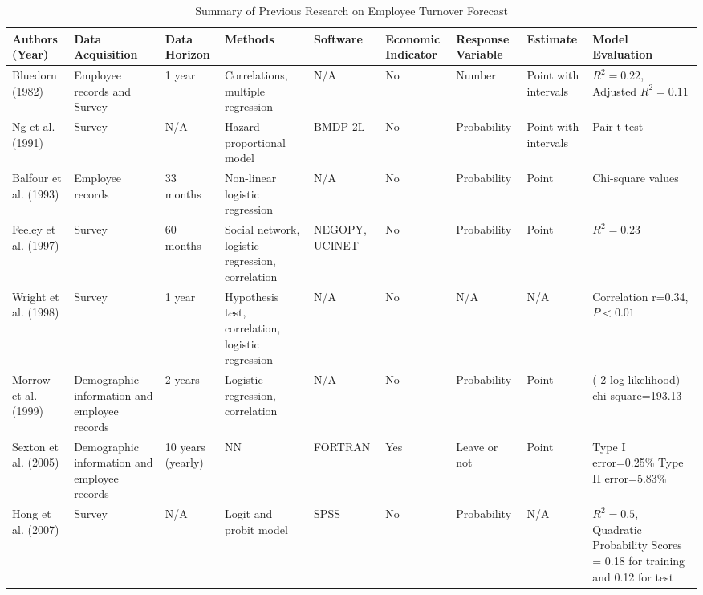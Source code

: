 \begin{landscape}%
\pagestyle{empty}%
	\begin{table}[htbp]
		\centering
		\scriptsize
		\caption{Summary of Previous Research on Employee Turnover Forecast}
		\begin{tabular}{L{2.8cm}  L{2.8cm}  C{1.2cm}  L{3cm} C{1.2cm}  C{1.5cm} C{1.5cm} C{1.5cm}  L{2.8cm}}
			\toprule
			Authors (Year) & Data Acquisition &  Data Horizon & Methods & Software & Economic Indicator & Response Variable & Estimate & Model Evaluation \\
			\midrule
			Bluedorn (1982)& Employee records and Survey & 1 year & Correlations, multiple regression & N/A & No & Number & Point with intervals& $R^2=0.22$, Adjusted $R^2=0.11$ \\
			
			Ng et al. (1991) & Survey & N/A   & Hazard proportional model & BMDP 2L & No    &  Probability  & Point with intervals & Pair t-test  \\
			
			Balfour et al. (1993) & Employee records  & 33 months & Non-linear logistic regression & N/A   & No    & Probability  & Point & Chi-square values  \\
			
			Feeley et al. (1997) & Survey & 60 months & Social network, logistic regression, correlation & NEGOPY, UCINET & No    & Probability  & Point & $R^2=0.23$ \\
			
			Wright et al. (1998) & Survey & 1 year & Hypothesis test, correlation, logistic regression  & N/A   & No    & N/A   & N/A   & Correlation r=0.34, $P<0.01$ \\
			
			Morrow et al. (1999) & Demographic information and employee records & 2 years & Logistic regression, correlation & N/A   & No    & Probability  & Point & (-2 log likelihood) chi-square=193.13 \\
			
			Sexton et al. (2005) & Demographic information and employee records & 10 years (yearly) & NN    & FORTRAN  & Yes   & Leave or not & Point & Type I error=0.25\% Type II error=5.83\% \\
			
			Hong et al. (2007) & Survey & N/A   & Logit and probit model & SPSS  & No    & Probability  & N/A   & $R^2=0.5$, Quadratic Probability Scores = 0.18 for training and 0.12 for test \\
			

\end{tabular}
\end{table}
\end{landscape}
